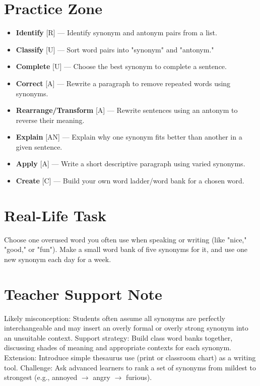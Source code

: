 \section{Practice Zone}
\begin{itemize}
    \item[A.] \textbf{Identify} [R] — Identify synonym and antonym pairs from a list.
    \item[B.] \textbf{Classify} [U] — Sort word pairs into "synonym" and "antonym."
    \item[C.] \textbf{Complete} [U] — Choose the best synonym to complete a sentence.
    \item[D.] \textbf{Correct} [A] — Rewrite a paragraph to remove repeated words using synonyms.
    \item[E.] \textbf{Rearrange/Transform} [A] — Rewrite sentences using an antonym to reverse their meaning.
    \item[F.] \textbf{Explain} [AN] — Explain why one synonym fits better than another in a given sentence.
    \item[G.] \textbf{Apply} [A] — Write a short descriptive paragraph using varied synonyms.
    \item[H.] \textbf{Create} [C] — Build your own word ladder/word bank for a chosen word.
\end{itemize}

\section{Real-Life Task}
Choose one overused word you often use when speaking or writing (like "nice," "good," or "fun"). Make a small word bank of five synonyms for it, and use one new synonym each day for a week.

\section{Teacher Support Note}
\begin{teachersupport}
Likely misconception: Students often assume all synonyms are perfectly interchangeable and may insert an overly formal or overly strong synonym into an unsuitable context. Support strategy: Build class word banks together, discussing shades of meaning and appropriate contexts for each synonym. Extension: Introduce simple thesaurus use (print or classroom chart) as a writing tool. Challenge: Ask advanced learners to rank a set of synonyms from mildest to strongest (e.g., annoyed $\rightarrow$ angry $\rightarrow$ furious).
\end{teachersupport}

